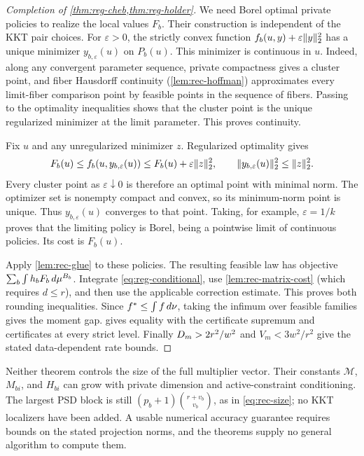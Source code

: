 \begin{proof}[Completion of \cref{thm:reg-cheb,thm:reg-holder}]
We need Borel optimal private policies to realize the local values
$F_b$. Their construction is independent of the KKT pair choices.
For $\varepsilon>0$, the strictly convex function
$f_b(u,y)+\varepsilon\lVert y\rVert_2^2$ has a unique minimizer
$y_{b,\varepsilon}(u)$ on $P_b(u)$. This minimizer is continuous in $u$.
Indeed, along any convergent parameter sequence, private compactness gives
a cluster point, and fiber Hausdorff continuity
(\cref{lem:rec-hoffman}) approximates every limit-fiber comparison point
by feasible points in the sequence of fibers. Passing to the optimality
inequalities shows that the cluster point is the unique regularized
minimizer at the limit parameter. This proves continuity.

Fix $u$ and any unregularized minimizer $z$. Regularized optimality gives
\[
 F_b(u)\le f_b(u,y_{b,\varepsilon}(u))\le
 F_b(u)+\varepsilon\lVert z\rVert_2^2,\qquad
 \lVert y_{b,\varepsilon}(u)\rVert_2^2\le\lVert z\rVert_2^2.
\]
Every cluster point as $\varepsilon\downarrow0$ is therefore an optimal
point with minimal norm. The optimizer set is nonempty compact and convex,
so its minimum-norm point is unique. Thus
$y_{b,\varepsilon}(u)$ converges to that point. Taking, for example,
$\varepsilon=1/k$ proves that the limiting policy is Borel, being a
pointwise limit of continuous policies. Its cost is $F_b(u)$.

Apply \cref{lem:rec-glue} to these policies. The resulting feasible law
has objective $\sum_b\int h_bF_b\,d\mu^{B_b}$. Integrate
\eqref{eq:reg-conditional}, use \cref{lem:rec-matrix-cost} (which requires
$d\le r$), and then use the applicable correction estimate. This proves
both rounding inequalities. Since $f^{*}\le\int f\,d\nu$, taking the
infimum over feasible families gives the moment gap. 
gives equality with the certificate supremum and certificates at every
strict level. Finally $D_m>2r^2/w^2$ and $V_m<3w^2/r^2$ give the stated
data-dependent rate bounds.
\end{proof}

Neither theorem controls the size of the full multiplier vector. Their
constants $\mathcal M$, $M_{bi}$, and $H_{bi}$ can grow with private
dimension and active-constraint conditioning. The largest PSD block is
still $(p_b+1)\binom{r+v_b}{v_b}$, as in \eqref{eq:rec-size}; no KKT
localizers have been added. A usable numerical accuracy guarantee requires
bounds on the stated projection norms, and the theorems supply no general
algorithm to compute them.

